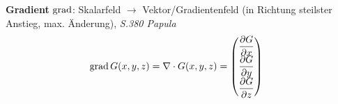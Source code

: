 \textbf{Gradient} $\operatorname{grad}$: Skalarfeld $\rightarrow$ Vektor/Gradientenfeld (in Richtung steilster Anstieg, max. Änderung), \textit{S.380 Papula}
\begin{align*}
    \operatorname{grad} G (x,y,z) & = \nabla \cdot G (x,y,z)  =  
    \begin{pmatrix}
        \dfrac{\partial G}{\partial x} \\
        \dfrac{\partial G}{\partial y} \\
        \dfrac{\partial G}{\partial z}
    \end{pmatrix}
\end{align*}

